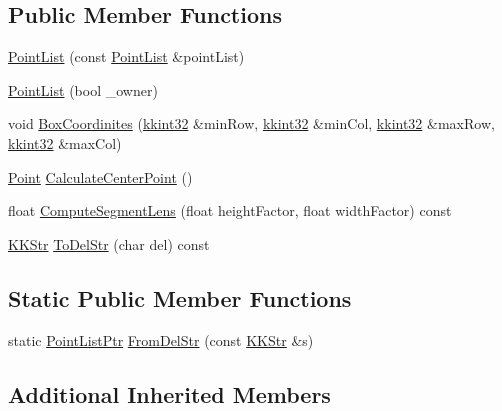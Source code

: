 \subsection*{Public Member Functions}
\begin{DoxyCompactItemize}
\item 
\hyperlink{class_k_k_b_1_1_point_list_a23bf858f650e6db462382919b02e4fcd}{Point\+List} (const \hyperlink{class_k_k_b_1_1_point_list}{Point\+List} \&point\+List)
\item 
\hyperlink{class_k_k_b_1_1_point_list_a3249bff2a2964884fb2ef535248e9f05}{Point\+List} (bool \+\_\+owner)
\item 
void \hyperlink{class_k_k_b_1_1_point_list_a88e04c04e513be256b1528e1f56db795}{Box\+Coordinites} (\hyperlink{namespace_k_k_b_a8fa4952cc84fda1de4bec1fbdd8d5b1b}{kkint32} \&min\+Row, \hyperlink{namespace_k_k_b_a8fa4952cc84fda1de4bec1fbdd8d5b1b}{kkint32} \&min\+Col, \hyperlink{namespace_k_k_b_a8fa4952cc84fda1de4bec1fbdd8d5b1b}{kkint32} \&max\+Row, \hyperlink{namespace_k_k_b_a8fa4952cc84fda1de4bec1fbdd8d5b1b}{kkint32} \&max\+Col)
\item 
\hyperlink{class_k_k_b_1_1_point}{Point} \hyperlink{class_k_k_b_1_1_point_list_a7d4d04d6634c57306d578d7c1b68e77a}{Calculate\+Center\+Point} ()
\item 
float \hyperlink{class_k_k_b_1_1_point_list_a0ce92775337aa4b62a0a49fef0d40626}{Compute\+Segment\+Lens} (float height\+Factor, float width\+Factor) const 
\item 
\hyperlink{class_k_k_b_1_1_k_k_str}{K\+K\+Str} \hyperlink{class_k_k_b_1_1_point_list_a69c5c11221415ee7f9cd968a75d40774}{To\+Del\+Str} (char del) const 
\end{DoxyCompactItemize}
\subsection*{Static Public Member Functions}
\begin{DoxyCompactItemize}
\item 
static \hyperlink{class_k_k_b_1_1_point_list_af5058320a40be067bf73c2d78ff8b35d}{Point\+List\+Ptr} \hyperlink{class_k_k_b_1_1_point_list_a9b650b13f7e46d57ed47eb36c40906d1}{From\+Del\+Str} (const \hyperlink{class_k_k_b_1_1_k_k_str}{K\+K\+Str} \&s)
\end{DoxyCompactItemize}
\subsection*{Additional Inherited Members}



